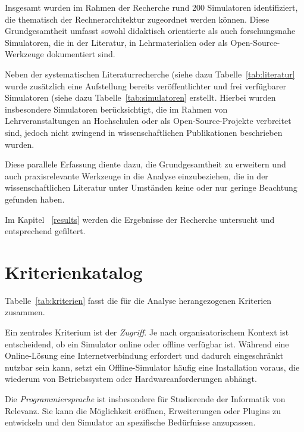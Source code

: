 Insgesamt wurden im Rahmen der Recherche rund 200 Simulatoren identifiziert, die thematisch der Rechnerarchitektur zugeordnet werden können. Diese Grundgesamtheit umfasst sowohl didaktisch orientierte als auch forschungsnahe Simulatoren, die in der Literatur, in Lehrmaterialien oder als Open-Source-Werkzeuge dokumentiert sind.

Neben der systematischen Literaturrecherche (siehe dazu Tabelle~\ref{tab:literatur} wurde zusätzlich eine Aufstellung bereits veröffentlichter und frei verfügbarer Simulatoren (siehe dazu Tabelle~\ref{tab:simulatoren} erstellt. Hierbei wurden insbesondere Simulatoren berücksichtigt, die im Rahmen von Lehrveranstaltungen an Hochschulen oder als Open-Source-Projekte verbreitet sind, jedoch nicht zwingend in wissenschaftlichen Publikationen beschrieben wurden.

Diese parallele Erfassung diente dazu, die Grundgesamtheit zu erweitern und auch praxisrelevante Werkzeuge in die Analyse einzubeziehen, die in der wissenschaftlichen Literatur unter Umständen keine oder nur geringe Beachtung gefunden haben.

Im Kapitel ~\ref{results} werden die Ergebnisse der Recherche untersucht und entsprechend gefiltert.

\section{Kriterienkatalog}




Tabelle~\ref{tab:kriterien} fasst die für die Analyse herangezogenen Kriterien zusammen.

Ein zentrales Kriterium ist der \textit{Zugriff}. Je nach organisatorischem Kontext ist entscheidend, ob ein Simulator online oder offline verfügbar ist. Während eine Online-Lösung eine Internetverbindung erfordert und dadurch eingeschränkt nutzbar sein kann, setzt ein Offline-Simulator häufig eine Installation voraus, die wiederum von Betriebssystem oder Hardwareanforderungen abhängt.

Die \textit{Programmiersprache} ist insbesondere für Studierende der Informatik von Relevanz. Sie kann die Möglichkeit eröffnen, Erweiterungen oder Plugins zu entwickeln und den Simulator an spezifische Bedürfnisse anzupassen.

